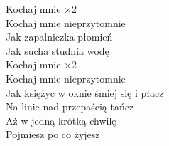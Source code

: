 \documentclass[a5paper, 10pt]{book}
\begin{document}
\begin{minipage}[t]{0.7\textwidth}
  \hspace*{5mm}Kochaj mnie  \hspace*{8mm} $\times$2\\
  \hspace*{5mm}Kochaj mnie nieprzytomnie\\
  \hspace*{5mm}Jak zapalniczka płomień\\
  \hspace*{5mm}Jak sucha studnia wodę\\

  \hspace*{5mm}Kochaj mnie  \hspace*{8mm} $\times$2\\
  \hspace*{5mm}Kochaj mnie nieprzytomnie\\
  \hspace*{5mm}Jak księżyc w oknie śmiej się i płacz\\
  \hspace*{5mm}Na linie nad przepaścią tańcz\\
  \hspace*{5mm}Aż w jedną krótką chwilę\\
  \hspace*{5mm}Pojmiesz po co żyjesz\\
\end{minipage}
\end{document}
